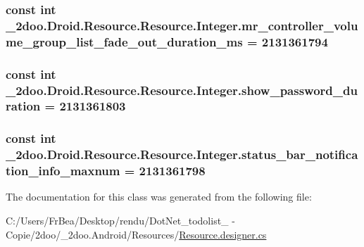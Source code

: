 \hypertarget{class__2doo_1_1_droid_1_1_resource_1_1_integer_2405f58d99e4be981aee758feb74df57}{
\subsubsection[{mr\_\-controller\_\-volume\_\-group\_\-list\_\-fade\_\-out\_\-duration\_\-ms}]{\setlength{\rightskip}{0pt plus 5cm}const int \_\-2doo.Droid.Resource.Resource.Integer.mr\_\-controller\_\-volume\_\-group\_\-list\_\-fade\_\-out\_\-duration\_\-ms = 2131361794}}
\label{class__2doo_1_1_droid_1_1_resource_1_1_integer_2405f58d99e4be981aee758feb74df57}


\hypertarget{class__2doo_1_1_droid_1_1_resource_1_1_integer_c3ec04547cec238c285078056d790634}{
\subsubsection[{show\_\-password\_\-duration}]{\setlength{\rightskip}{0pt plus 5cm}const int \_\-2doo.Droid.Resource.Resource.Integer.show\_\-password\_\-duration = 2131361803}}
\label{class__2doo_1_1_droid_1_1_resource_1_1_integer_c3ec04547cec238c285078056d790634}


\hypertarget{class__2doo_1_1_droid_1_1_resource_1_1_integer_3abfb0d8c548fa3801b3209f19cc183f}{
\subsubsection[{status\_\-bar\_\-notification\_\-info\_\-maxnum}]{\setlength{\rightskip}{0pt plus 5cm}const int \_\-2doo.Droid.Resource.Resource.Integer.status\_\-bar\_\-notification\_\-info\_\-maxnum = 2131361798}}
\label{class__2doo_1_1_droid_1_1_resource_1_1_integer_3abfb0d8c548fa3801b3209f19cc183f}




The documentation for this class was generated from the following file:\begin{CompactItemize}
\item 
C:/Users/FrBea/Desktop/rendu/DotNet\_\-todolist\_ - Copie/2doo/\_\-2doo.Android/Resources/\hyperlink{_resource_8designer_8cs}{Resource.designer.cs}\end{CompactItemize}
